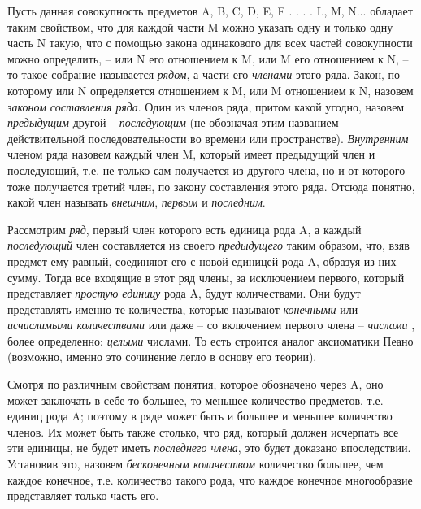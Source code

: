 \documentclass[12pt]{extarticle}
\begin{document}
Пусть данная совокупность предметов A, B, C, D, E, F . . . . L, M, N... обладает таким свойством, что для каждой части M можно указать одну и только одну часть N такую, что с помощью закона одинакового для всех частей совокупности можно определить, – или N его отношением к M, или M его отношением к N, – то такое собрание называется \textit{рядом}, а части его \textit{членами} этого ряда. Закон, по
которому или N определяется отношением к M, или M отношением к N,
назовем \textit{законом составления ряда}. Один из членов ряда, притом какой угодно, назовем \textit{предыдущим} 
другой – \textit{последующим} (не обозначая этим названием
действительной последовательности во времени или пространстве). \textit{Внутренним} членом ряда назовем каждый член M, который имеет предыдущий член и последующий, т.е. не только сам получается из
другого члена, но и от которого тоже получается третий член, по закону
составления этого ряда. Отсюда понятно, какой член называть \textit{внешним}, \textit{первым} и \textit{последним}.

Рассмотрим \textit{ряд}, первый член которого есть
единица рода A, а каждый \textit{последующий} член составляется из своего \textit{предыдущего} таким образом, что, взяв предмет ему равный, соединяют его с новой единицей рода A, образуя из них сумму. Тогда все входящие в этот ряд члены, за исключением первого, который
представляет \textit{простую единицу} рода A, будут количествами.
Они будут представлять именно те количества, которые называют
\textit{конечными} или \textit{исчислимыми количествами}
или даже – со включением первого члена – \textit{числами} , более
определенно: \textit{целыми} числами. То есть строится аналог аксиоматики Пеано (возможно, именно это сочинение легло в основу его теории).

Смотря по различным свойствам понятия, которое обозначено через A, оно может заключать в себе то большее, то меньшее количество предметов, т.е. единиц рода A; поэтому в ряде может быть и большее и меньшее количество членов. Их может быть также столько, что ряд, который должен исчерпать все эти единицы, не будет иметь \textit{последнего члена}, это будет доказано впоследствии. Установив это, назовем
\textit{бесконечным количеством} количество большее, чем
каждое конечное, т.е. количество такого рода, что каждое конечное
многообразие представляет только часть его.
\end{document}
